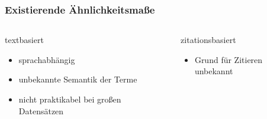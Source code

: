 \documentclass[12pt, xcolor=table]{beamer}
\begin{document}
\begin{frame}
    \frametitle{Existierende Ähnlichkeitsmaße}
    \begin{columns}[T]
        \begin{column}{0.45\textwidth}
        \begin{block}{textbasiert}
            \begin{itemize}
                \item sprachabhängig
                \item unbekannte Semantik der Terme
                \item nicht praktikabel bei großen Datensätzen
            \end{itemize}
        \end{block}
        \end{column}

        \begin{column}{0.45\textwidth}
        \begin{block}{zitationsbasiert}
            \begin{itemize}
                \item Grund für Zitieren unbekannt
            \end{itemize}
        \end{block}
        \end{column}
    \end{columns}

\end{frame}
\end{document}
